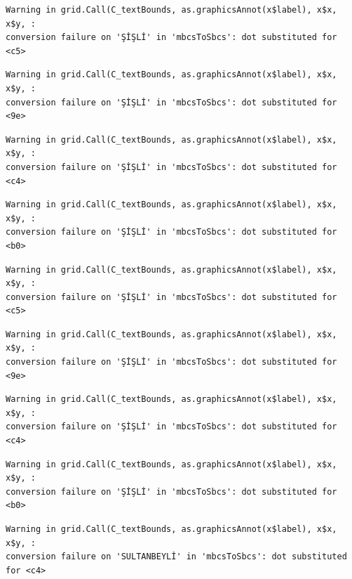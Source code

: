 \documentclass[
  11pt,
  a4paper,
  DIV=11,
  numbers=noendperiod]{scrartcl}
\begin{document}
\begin{verbatim}
Warning in grid.Call(C_textBounds, as.graphicsAnnot(x$label), x$x, x$y, :
conversion failure on 'ŞİŞLİ' in 'mbcsToSbcs': dot substituted for <c5>
\end{verbatim}

\begin{verbatim}
Warning in grid.Call(C_textBounds, as.graphicsAnnot(x$label), x$x, x$y, :
conversion failure on 'ŞİŞLİ' in 'mbcsToSbcs': dot substituted for <9e>
\end{verbatim}

\begin{verbatim}
Warning in grid.Call(C_textBounds, as.graphicsAnnot(x$label), x$x, x$y, :
conversion failure on 'ŞİŞLİ' in 'mbcsToSbcs': dot substituted for <c4>
\end{verbatim}

\begin{verbatim}
Warning in grid.Call(C_textBounds, as.graphicsAnnot(x$label), x$x, x$y, :
conversion failure on 'ŞİŞLİ' in 'mbcsToSbcs': dot substituted for <b0>
\end{verbatim}

\begin{verbatim}
Warning in grid.Call(C_textBounds, as.graphicsAnnot(x$label), x$x, x$y, :
conversion failure on 'ŞİŞLİ' in 'mbcsToSbcs': dot substituted for <c5>
\end{verbatim}

\begin{verbatim}
Warning in grid.Call(C_textBounds, as.graphicsAnnot(x$label), x$x, x$y, :
conversion failure on 'ŞİŞLİ' in 'mbcsToSbcs': dot substituted for <9e>
\end{verbatim}

\begin{verbatim}
Warning in grid.Call(C_textBounds, as.graphicsAnnot(x$label), x$x, x$y, :
conversion failure on 'ŞİŞLİ' in 'mbcsToSbcs': dot substituted for <c4>
\end{verbatim}

\begin{verbatim}
Warning in grid.Call(C_textBounds, as.graphicsAnnot(x$label), x$x, x$y, :
conversion failure on 'ŞİŞLİ' in 'mbcsToSbcs': dot substituted for <b0>
\end{verbatim}

\begin{verbatim}
Warning in grid.Call(C_textBounds, as.graphicsAnnot(x$label), x$x, x$y, :
conversion failure on 'SULTANBEYLİ' in 'mbcsToSbcs': dot substituted for <c4>
\end{verbatim}
\end{document}
